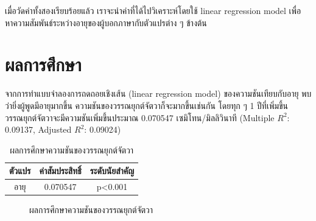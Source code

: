 \documentclass[a4paper]{article}
\begin{document}
    เมื่อวัดค่าทั้งสองเรียบร้อยแล้ว เราจะนำค่าที่ได้ไปวิเคราะห์โดยใช้ linear regression model เพื่อหาความสัมพันธ์ระหว่างอายุของผู้บอกภาษากับตัวแปรต่าง ๆ ข้างต้น
\section{ผลการศึกษา}
    จากการทำแบบจําลองการถดถอยเชิงเส้น (linear regression model) ของความชันเทียบกับอายุ พบว่ายิ่งผู้พูดมีอายุมากขึ้น ความชันของวรรณยุกต์จัตวาก็จะมากขึ้นเช่นกัน โดยทุก ๆ 1 ปีที่เพิ่มขึ้น วรรณยุกต์จัตวาจะมีความชันเพิ่มขึ้นประมาณ 0.070547 เซมิโทน/มิลลิวินาที (Multiple $R^2$: 0.09137, Adjusted $R^2$: 0.09024)
    \begin{table}[!ht]
        \begin{center}
        \begin{tabular}{|c|c|c|}
            \hline
            ตัวแปร & ค่าสัมประสิทธิ์ & ระดับนัยสำคัญ \\
            \hline
            อายุ & 0.070547 & p<0.001 \\
            \hline
        \end{tabular}
        \end{center}
        \caption{ผลการศึกษาความชันของวรรณยุกต์จัตวา}
    \end{table}
    \begin{figure}[!ht]
        \begin{center}
        \end{center}
        \caption{ผลการศึกษาความชันของวรรณยุกต์จัตวา}
    \end{figure}
\end{document}
